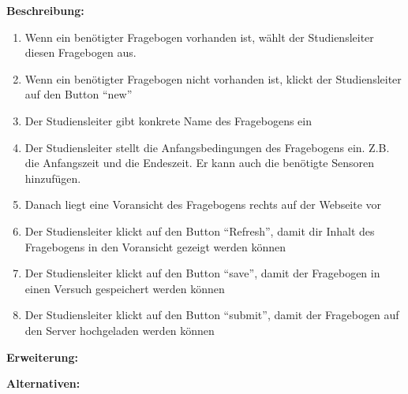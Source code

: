 \documentclass[a4paper]{scrreprt}
\begin{document}
\begin{itemize}
                \par \textbf{Beschreibung: }
                \begin{enumerate}
                    \item Wenn ein benötigter Fragebogen vorhanden ist, wählt der \gls{Studiensleiter} diesen Fragebogen aus.
                    \item Wenn ein benötigter Fragebogen nicht vorhanden ist, klickt der \gls{Studiensleiter} auf den Button ``new''
                    \item Der \gls{Studiensleiter} gibt konkrete Name des Fragebogens ein
                    \item Der \gls{Studiensleiter} stellt die Anfangsbedingungen des Fragebogens ein. Z.B. die Anfangszeit und die Endeszeit. Er kann auch die benötigte Sensoren hinzufügen.
                    \item Danach liegt eine Voransicht des Fragebogens rechts auf der Webseite vor
                    \item  Der \gls{Studiensleiter} klickt auf den Button ``Refresh'', damit dir Inhalt des Fragebogens in den Voransicht gezeigt werden können
                    \item Der \gls{Studiensleiter} klickt auf den Button ``save'', damit der Fragebogen in einen Versuch gespeichert werden können
                    \item Der \gls{Studiensleiter} klickt auf den Button ``submit'', damit der Fragebogen auf den Server hochgeladen werden können
                \end{enumerate}
                \par \textbf{Erweiterung: }
                \par \textbf{Alternativen: }
                \begin{figure}[H]
                    \centering

\end{figure}
\end{itemize}
\end{document}
